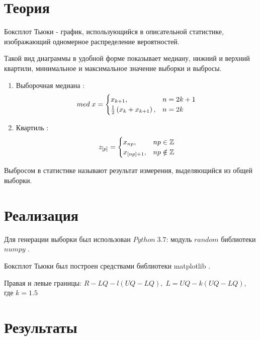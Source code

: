 \documentclass[12pt]{report}
\begin{document}
\section{Теория}

Боксплот Тьюки - график, использующийся в описательной статистике, изображающий одномерное распределение вероятностей. \cite{sas}

Такой вид диаграммы в удобной форме показывает медиану, нижний и верхний квартили, минимальное и максимальное значение выборки и выбросы.

\begin{enumerate}
\item Выборочная медиана \cite{med}:
\begin{equation}
med\; x = \begin{cases}
x_{k+1}, & n = 2k+1\\
\frac{1}{2}\left(x_k+x_{k+1}\right), & n = 2k
\end{cases} \hfill  \label{eqn:med}
\end{equation}

\item Квартиль \cite{quart}:
\begin{equation}
z_{[p]} = \begin{cases}
x_{np}, & np \in \mathbb{Z}\\
x_{[np]+1}, & np \notin \mathbb{Z}
\end{cases} \hfill  \label{eqn:quart}
\end{equation}
\end{enumerate}

Выбросом в статистике называют результат измерения, выделяющийся из общей выборки.


\section{Реализация}

Для генерации выборки был использован $Python\;3.7$: модуль $random$ библиотеки $numpy$ \cite{numpy}.

Боксплот Тьюки был построен средствами библиотеки matplotlib \cite{plotlib}.

Правая и левые границы:  $R- LQ - l(UQ - LQ),\;L = UQ -k(UQ - LQ),$ где $k=1.5$ 

\section{Результаты}
\end{document}
